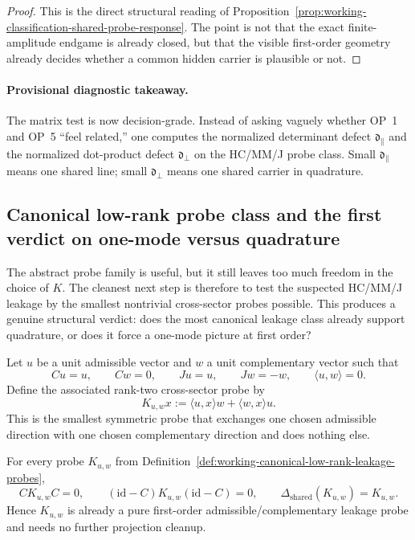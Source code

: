 \begin{proof}
This is the direct structural reading of Proposition~\ref{prop:working-classification-shared-probe-response}. The point is not that the exact finite-amplitude endgame is already closed, but that the visible first-order geometry already decides whether a common hidden carrier is plausible or not.
\end{proof}

\paragraph{Provisional diagnostic takeaway.}
The matrix test is now decision-grade. Instead of asking vaguely whether OP~1 and OP~5 ``feel related,'' one computes the normalized determinant defect $\mathfrak d_{\parallel}$ and the normalized dot-product defect $\mathfrak d_{\perp}$ on the HC/MM/J probe class. Small $\mathfrak d_{\parallel}$ means one shared line; small $\mathfrak d_{\perp}$ means one shared carrier in quadrature.


\subsection*{Canonical low-rank probe class and the first verdict on one-mode versus quadrature}
The abstract probe family is useful, but it still leaves too much freedom in the choice of $K$. The cleanest next step is therefore to test the suspected HC/MM/J leakage by the smallest nontrivial cross-sector probes possible. This produces a genuine structural verdict: does the most canonical leakage class already support quadrature, or does it force a one-mode picture at first order?

\begin{definition}
\label{def:working-canonical-low-rank-leakage-probes}
Let $u$ be a unit admissible vector and $w$ a unit complementary vector such that
\[
  Cu=u,
  \qquad
  Cw=0,
  \qquad
  Ju=u,
  \qquad
  Jw=-w,
  \qquad
  \langle u,w\rangle=0.
\]
Define the associated rank-two cross-sector probe by
\[
  K_{u,w}x
  :=
  \langle u,x\rangle w + \langle w,x\rangle u.
\]
This is the smallest symmetric probe that exchanges one chosen admissible direction with one chosen complementary direction and does nothing else.
\end{definition}

\begin{proposition}
\label{prop:working-exact-support-canonical-low-rank-probes}
For every probe $K_{u,w}$ from Definition~\ref{def:working-canonical-low-rank-leakage-probes},
\[
  CK_{u,w}C=0,
  \qquad
  (\mathrm{id}-C)K_{u,w}(\mathrm{id}-C)=0,
  \qquad
  \Delta_{\mathrm{shared}}(K_{u,w})=K_{u,w}.
\]
Hence $K_{u,w}$ is already a pure first-order admissible/complementary leakage probe and needs no further projection cleanup.
\end{proposition}

